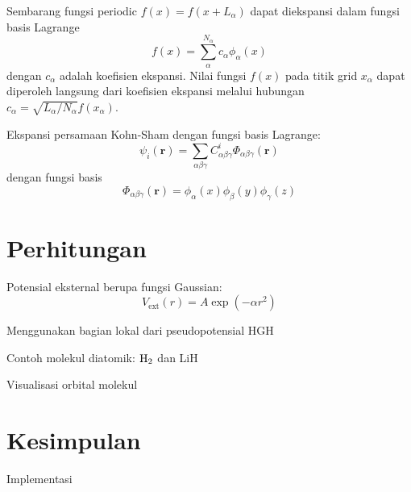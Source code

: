 \documentclass[%
reprint,
amsmath,
amssymb,
aps,
]{revtex4-1}
\begin{document}
Sembarang fungsi periodic $f(x) = f(x+L_{\alpha})$ dapat diekspansi dalam fungsi basis
Lagrange
\begin{equation}
f(x) = \sum_{\alpha}^{N_{\alpha}} c_{\alpha} \phi_{\alpha}(x)
\end{equation}
dengan $c_{\alpha}$ adalah koefisien ekspansi.
Nilai fungsi $f(x)$ pada titik grid $x_{\alpha}$ dapat diperoleh langsung
dari koefisien ekspansi melalui hubungan
$c_{\alpha} = \sqrt{L_{\alpha}/N_{\alpha}}f(x_{\alpha})$.

Ekspansi persamaan Kohn-Sham dengan fungsi basis Lagrange:
\begin{equation}
\psi_{i}(\mathbf{r}) = \sum_{\alpha\beta\gamma}
C^{i}_{\alpha\beta\gamma} \Phi_{\alpha\beta\gamma}(\mathbf{r})
\end{equation}
dengan fungsi basis \cite{Baye2015}
\begin{equation}
\Phi_{\alpha\beta\gamma}(\mathbf{r}) =
\phi_{\alpha}(x)\phi_{\beta}(y)\phi_{\gamma}(z)
\end{equation}




\section{Perhitungan}

Potensial eksternal berupa fungsi Gaussian:
\begin{equation}
V_{\mathrm{ext}}(r) = A\exp(-\alpha r^2)
\end{equation}

Menggunakan bagian lokal dari pseudopotensial HGH

Contoh molekul diatomik: $\ce{H2}$ dan LiH

Visualisasi orbital molekul

\section{Kesimpulan}

Implementasi


\end{document}
